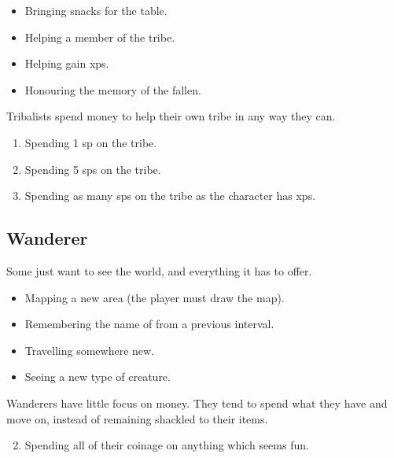 \begin{multicols}{2}
\begin{itemize}
  \item
  Bringing snacks for the table.
  \item
  Helping a member of the tribe.
  \item
  Helping  gain \glspl{xp}.
  \item
  Honouring the memory of the fallen.
\end{itemize}

Tribalists spend money to help their own tribe in any way they can.

\begin{enumerate}
  \item
  Spending 1 \gls{sp} on the tribe.
  \item
  Spending 5 \glspl{sp} on the tribe.
  \item
  Spending as many \glspl{sp} on the tribe as the character has \glspl{xp}.
\end{enumerate}

\subsection{Wanderer}
\label{wanderer}

Some just want to see the world, and everything it has to offer.

\begin{itemize}

  \item
  Mapping a new area (the player must draw the map).
  \item
  Remembering the name of  from a previous \gls{interval}.
  \item
  Travelling somewhere new.
  \item
  Seeing a new type of creature.

\end{itemize}

Wanderers have little focus on money.
They tend to spend what they have and move on, instead of remaining shackled to their items.

\begin{enumerate}
  \setcounter{enumi}{1}
  \item
  Spending all of their coinage on anything which seems fun.
\end{enumerate}


\end{multicols}

\section{}
\label{xpCosts}

